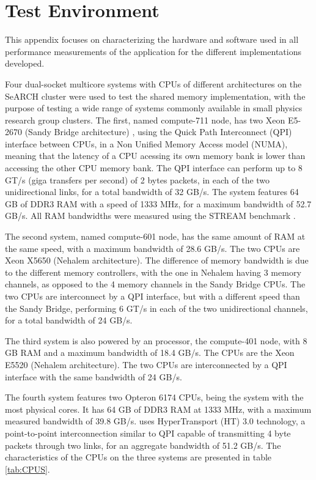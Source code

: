 \chapter{Test Environment}
\label{App:TestEnv}

This appendix focuses on characterizing the hardware and software used in all performance measurements of the application for the different implementations developed.

Four dual-socket multicore systems with CPUs of different architectures on the SeARCH cluster were used to test the shared memory implementation, with the purpose of testing a wide range of systems commonly available in small physics research group clusters. The first, named compute-711 node, has two \intel Xeon E5-2670 (Sandy Bridge architecture) \cite{Intel:E52650}, using the Quick Path Interconnect (QPI) interface between CPUs, in a Non Unified Memory Access model (NUMA), meaning that the latency of a CPU acessing its own memory bank is lower than accessing the other CPU memory bank. The QPI interface can perform up to 8 GT/s (giga transfers per second) of 2 bytes packets, in each of the two unidirectional links, for a total bandwidth of 32 GB/s. The system features 64 GB of DDR3 RAM with a speed of 1333 MHz, for a maximum bandwidth of 52.7 GB/s. All RAM bandwidths were measured using the STREAM benchmark \cite{STREAM}.

The second system, named compute-601 node, has the same amount of RAM at the same speed, with a maximum bandwidth of 28.6 GB/s. The two CPUs are \intel Xeon X5650 (Nehalem architecture). The difference of memory bandwidth is due to the different memory controllers, with the one in Nehalem having 3 memory channels, as opposed to the 4 memory channels in the Sandy Bridge CPUs. The two CPUs are interconnect by a QPI interface, but with a different speed than the Sandy Bridge, performing 6 GT/s in each of the two unidirectional channels, for a total bandwidth of 24 GB/s.

The third system is also powered by an \intel processor, the compute-401 node, with 8 GB RAM and a maximum bandwidth of 18.4 GB/s. The CPUs are the Xeon E5520 (Nehalem architecture). The two CPUs are interconnected by a QPI interface with the same bandwidth of 24 GB/s.

The fourth system features two \amd Opteron 6174 CPUs, being the system with the most physical cores. It has 64 GB of DDR3 RAM at 1333 MHz, with a maximum measured bandwidth of 39.8 GB/s. \amd uses HyperTransport (HT) 3.0 technology, a point-to-point interconnection similar to QPI capable of transmitting 4 byte packets through two links, for an aggregate bandwidth of 51.2 GB/s. The characteristics of the CPUs on the three systems are presented in table \ref{tab:CPUS}.

